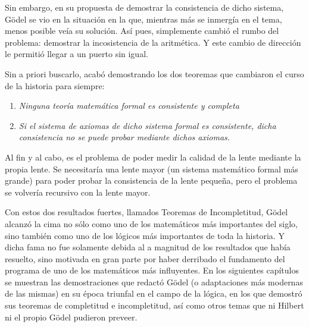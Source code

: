 Sin embargo, en su propuesta de demostrar la consistencia de dicho sistema, Gödel se vio en la situación en la que, mientras más se inmergía en el tema, menos posible veía su solución. 
Así pues, simplemente cambió el rumbo del problema: demostrar la incosistencia de la aritmética. Y este cambio de dirección le permitió llegar a un puerto sin igual.

Sin a priori buscarlo, acabó demostrando los dos teoremas que cambiaron el curso de la historia para siempre:

\begin{center}
    \begin{enumerate}
        \item \textit{Ninguna teoría matemática formal es consistente y completa}
        \item \textit{Si el sistema de axiomas de dicho sistema formal es consistente, dicha consistencia no se puede probar mediante dichos axiomas.}
    \end{enumerate}
\end{center}

Al fin y al cabo, es el problema de poder medir la calidad de la lente mediante la propia lente. Se necesitaría una lente mayor (un sistema matemático formal más grande) para poder probar
la consistencia de la lente pequeña, pero el problema se volvería recursivo con la lente mayor.

Con estos dos resultados fuertes, llamados Teoremas de Incompletitud, Gödel alcanzó la cima no sólo como uno de los matemáticos más importantes del siglo, sino también como uno de los 
lógicos más importantes de toda la historia. Y dicha fama no fue solamente debida al a magnitud de los resultados que había resuelto, sino motivada en gran parte por haber derribado el fundamento
del programa de uno de los matemáticos más influyentes. En los siguientes capítulos se muestran las demostraciones que redactó Gödel (o adaptaciones más modernas de las mismas) en su época triunfal en el campo de la lógica,
en los que demostró sus teoremas de completitud e incompletitud, así como otros temas que ni Hilbert ni el propio Gödel pudieron preveer.






\endinput

